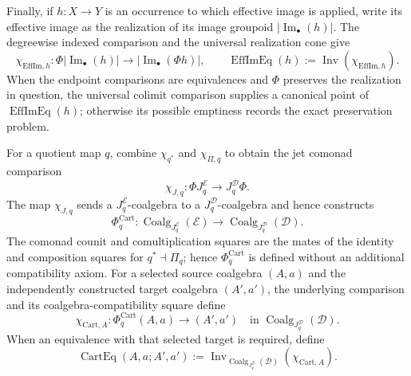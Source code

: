 \begin{construction}
Finally, if $h:X\to Y$ is an occurrence to which effective image is applied,
write its effective image as the realization of its image groupoid
$\lvert\operatorname{Im}_\bullet(h)\rvert$.  The degreewise indexed comparison
and the universal realization cone give
\[
\chi_{\mathrm{EffIm},h}:
\Phi\lvert\operatorname{Im}_\bullet(h)\rvert
\longrightarrow
\lvert\operatorname{Im}_\bullet(\Phi h)\rvert,
\qquad
\boxed{
\operatorname{EffImEq}(h):=
\operatorname{Inv}(\chi_{\mathrm{EffIm},h}).
}
\]
When the endpoint comparisons are equivalences and $\Phi$ preserves the
realization in question, the universal colimit comparison supplies a canonical
point of $\operatorname{EffImEq}(h)$; otherwise its possible emptiness records
the exact preservation problem.
\end{construction}

\begin{construction}
\label{constr:prequantum-cartan-mixed-comparison-exchanges}
For a quotient map $q$, combine $\chi_{q^*}$ and $\chi_{\Pi,q}$ to obtain the jet
comonad comparison
\[
\boxed{
\chi_{J,q}:
\Phi J_q^{\mathcal E}
\longrightarrow
J_q^{\mathcal D}\Phi.
}
\]
The map $\chi_{J,q}$ sends a $J_q^{\mathcal E}$-coalgebra to a
$J_q^{\mathcal D}$-coalgebra and hence constructs
\[
\Phi_q^{\mathrm{Cart}}:
\operatorname{Coalg}_{J_q^{\mathcal E}}(\mathcal E)
\longrightarrow
\operatorname{Coalg}_{J_q^{\mathcal D}}(\mathcal D).
\]
The comonad counit and comultiplication squares are the mates of the identity and
composition squares for $q^*\dashv\Pi_q$; hence
$\Phi_q^{\mathrm{Cart}}$ is defined without an additional compatibility axiom.
For a selected source coalgebra $(A,a)$ and the independently constructed target
coalgebra $(A',a')$, the underlying comparison and its coalgebra-compatibility
square define
\[
\chi_{\mathrm{Cart},A}:
\Phi_q^{\mathrm{Cart}}(A,a)\longrightarrow(A',a')
\quad\text{in }\operatorname{Coalg}_{J_q^{\mathcal D}}(\mathcal D).
\]
When an equivalence with that selected target is required, define
\[
\boxed{
\operatorname{CartEq}(A,a;A',a')
:=
\operatorname{Inv}_{\operatorname{Coalg}_{J_q^{\mathcal D}}(\mathcal D)}
(\chi_{\mathrm{Cart},A}).
}
\]


\end{construction}
